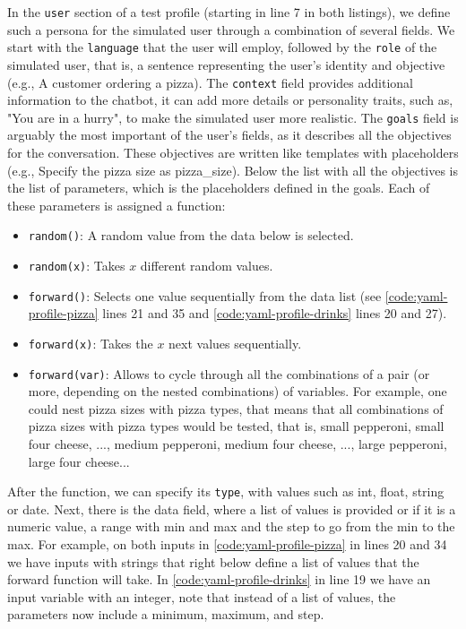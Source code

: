 In the \texttt{user} section of a test profile
(starting in line 7 in both listings),
we define such a persona for the simulated user
through a combination of several fields.
We start with the \texttt{language} that the user will employ,
followed by the \texttt{role} of the simulated user,
that is, a sentence representing the user's identity and objective
(e.g., A customer ordering a pizza).
The \texttt{context} field provides additional information to the chatbot,
it can add more details or personality traits, such as,
"You are in a hurry", to make the simulated user more realistic.
The \texttt{goals} field is arguably the most important of the user's fields,
as it describes all the objectives for the conversation.
These objectives are written like templates with placeholders
(e.g., Specify the pizza size as {{pizza\_size}}).
Below the list with all the objectives
is the list of parameters, which is the placeholders defined in the goals.
Each of these parameters is assigned a function:
\begin{itemize}
  \item \texttt{random()}: A random value from the data below is selected.
  \item \texttt{random(x)}: Takes $x$ different random values.
  \item \texttt{forward()}: Selects one value sequentially from the data list
    (see \autoref{code:yaml-profile-pizza} lines 21 and 35
    and \autoref{code:yaml-profile-drinks} lines 20 and 27).
  \item \texttt{forward(x)}: Takes the $x$ next values sequentially.
  \item \texttt{forward(var)}:
    Allows to cycle through all the combinations of a pair (or more, depending on the nested combinations) of variables.
    For example, one could nest pizza sizes with pizza types,
    that means that all combinations of pizza sizes with pizza types would be tested,
    that is, small pepperoni, small four cheese, ..., medium pepperoni, medium four cheese, ..., large pepperoni, large four cheese...
\end{itemize}
After the function, we can specify its \texttt{type},
with values such as int, float, string or date.
Next, there is the data field,
where a list of values is provided
or if it is a numeric value, a range with min and max
and the step to go from the min to the max.
For example, on both inputs in \autoref{code:yaml-profile-pizza}
in lines 20 and 34 we have inputs with strings
that right below define a list of values that
the forward function will take.
In \autoref{code:yaml-profile-drinks} in line 19
we have an input variable with an integer,
note that instead of a list of values,
the parameters now include a minimum, maximum, and step.

